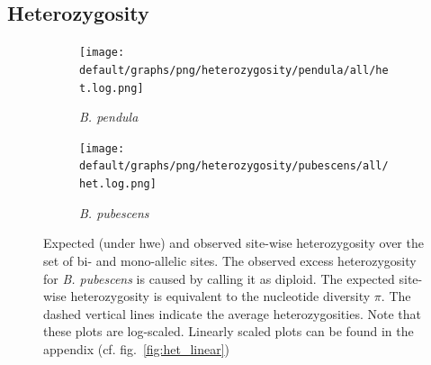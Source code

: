 \documentclass[hidelinks,11pt]{article}
\newcommand{\pendula}{\textit{B. pendula}}
\newcommand{\pubescens}{\textit{B. pubescens}}
\begin{document}
{    \subsection{Heterozygosity}
    \label{sec:het}

    \begin{figure}[ht]
        \centering
        \begin{subfigure}[b]{0.485\textwidth}
            \centering
            \texttt{[image: default/graphs/png/heterozygosity/pendula/all/het.log.png]}
            \caption{\pendula{}}
            \label{fig:het_pendula}
        \end{subfigure}
        \hfill
        \begin{subfigure}[b]{0.485\textwidth}
            \centering
            \texttt{[image: default/graphs/png/heterozygosity/pubescens/all/het.log.png]}
            \caption{\pubescens{}}
            \label{fig:het_pubescens}
        \end{subfigure}
        \caption{Expected (under \acrshort{hwe}) and observed site-wise heterozygosity over the set of bi- and mono-allelic sites. The observed excess heterozygosity for \pubescens{} is caused by calling it as diploid. The expected site-wise heterozygosity is equivalent to the nucleotide diversity $\pi$. The dashed vertical lines indicate the average heterozygosities. Note that these plots are log-scaled. Linearly scaled plots can be found in the appendix (cf. fig.~\ref{fig:het_linear})}
        \label{fig:het}
    \end{figure}

}
\end{document}

